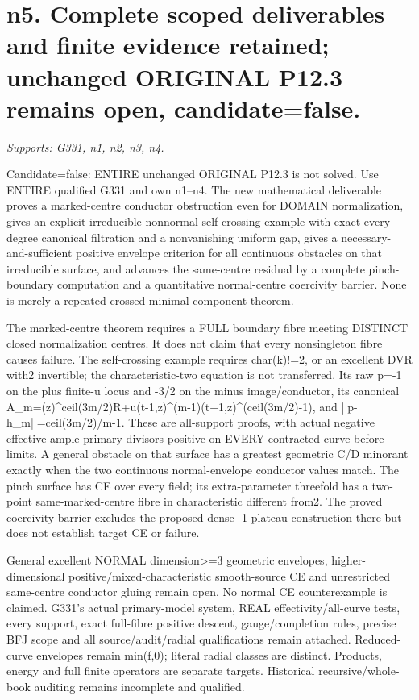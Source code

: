 \section{n5. Complete scoped deliverables and finite evidence retained; unchanged ORIGINAL P12.3 remains open, candidate=false.}
\textit{Supports: G331, n1, n2, n3, n4.}

Candidate=false: ENTIRE unchanged ORIGINAL P12.3 is not solved. Use ENTIRE qualified G331 and own n1--n4. The new mathematical deliverable proves a marked-centre conductor obstruction even for DOMAIN normalization, gives an explicit irreducible nonnormal self-crossing example with exact every-degree canonical filtration and a nonvanishing uniform gap, gives a necessary-and-sufficient positive envelope criterion for all continuous obstacles on that irreducible surface, and advances the same-centre residual by a complete pinch-boundary computation and a quantitative normal-centre coercivity barrier. None is merely a repeated crossed-minimal-component theorem.

The marked-centre theorem requires a FULL boundary fibre meeting DISTINCT closed normalization centres. It does not claim that every nonsingleton fibre causes failure. The self-crossing example requires char(k)!=2, or an excellent DVR with2 invertible; the characteristic-two equation is not transferred. Its raw p=-1 on the plus finite-u locus and -3/2 on the minus image/conductor, its canonical A\_m=(z)\textasciicircum{}ceil(3m/2)R+u(t-1,z)\textasciicircum{}(m-1)(t+1,z)\textasciicircum{}(ceil(3m/2)-1), and ||p-h\_m||=ceil(3m/2)/m-1. These are all-support proofs, with actual negative effective ample primary divisors positive on EVERY contracted curve before limits. A general obstacle on that surface has a greatest geometric C/D minorant exactly when the two continuous normal-envelope conductor values match. The pinch surface has CE over every field; its extra-parameter threefold has a two-point same-marked-centre fibre in characteristic different from2. The proved coercivity barrier excludes the proposed dense -1-plateau construction there but does not establish target CE or failure.

General excellent NORMAL dimension\textgreater{}=3 geometric envelopes, higher-dimensional positive/mixed-characteristic smooth-source CE and unrestricted same-centre conductor gluing remain open. No normal CE counterexample is claimed. G331's actual primary-model system, REAL effectivity/all-curve tests, every support, exact full-fibre positive descent, gauge/completion rules, precise BFJ scope and all source/audit/radial qualifications remain attached. Reduced-curve envelopes remain min(f,0); literal radial classes are distinct. Products, energy and full finite operators are separate targets. Historical recursive/whole-book auditing remains incomplete and qualified.

